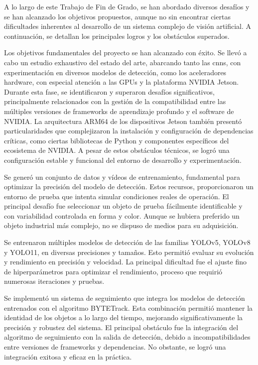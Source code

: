 \documentclass[11pt,spanish,listoffigures,listoftables]{tfgetsinf}
\begin{document}
A lo largo de este Trabajo de Fin de Grado, se han abordado diversos desafíos y se han alcanzado los objetivos propuestos, aunque no sin encontrar ciertas dificultades inherentes al desarrollo de un sistema complejo de visión artificial. A continuación, se detallan los principales logros y los obstáculos superados.

Los objetivos fundamentales del proyecto se han alcanzado con éxito. Se llevó a cabo un estudio exhaustivo del estado del arte, abarcando tanto las \glspl{cnn}, con experimentación en diversos modelos de detección, como los aceleradores hardware, con especial atención a las GPUs y la plataforma NVIDIA Jetson. Durante esta fase, se identificaron y superaron desafíos significativos, principalmente relacionados con la gestión de la compatibilidad entre las múltiples versiones de frameworks de aprendizaje profundo y el software de NVIDIA. La arquitectura ARM64 de los dispositivos Jetson también presentó particularidades que complejizaron la instalación y configuración de dependencias críticas, como ciertas bibliotecas de Python y componentes específicos del ecosistema de NVIDIA. A pesar de estos obstáculos técnicos, se logró una configuración estable y funcional del entorno de desarrollo y experimentación.

Se generó un conjunto de datos y vídeos de entrenamiento, fundamental para optimizar la precisión del modelo de detección. Estos recursos, proporcionaron un entorno de prueba que intenta simular condiciones reales de operación. El principal desafío fue seleccionar un objeto de prueba fácilmente identificable y con variabilidad controlada en forma y color. Aunque se hubiera preferido un objeto industrial más complejo, no se dispuso de medios para su adquisición.

Se entrenaron múltiples modelos de detección de las familias YOLOv5, YOLOv8 y YOLO11, en diversas precisiones y tamaños. Esto permitió evaluar su evolución y rendimiento en precisión y velocidad. La principal dificultad fue el ajuste fino de hiperparámetros para optimizar el rendimiento, proceso que requirió numerosas iteraciones y pruebas.

Se implementó un sistema de seguimiento que integra los modelos de detección entrenados con el algoritmo BYTETrack. Esta combinación permitió mantener la identidad de los objetos a lo largo del tiempo, mejorando significativamente la precisión y robustez del sistema. El principal obstáculo fue la integración del algoritmo de seguimiento con la salida de detección, debido a incompatibilidades entre versiones de frameworks y dependencias. No obstante, se logró una integración exitosa y eficaz en la práctica.
\end{document}
